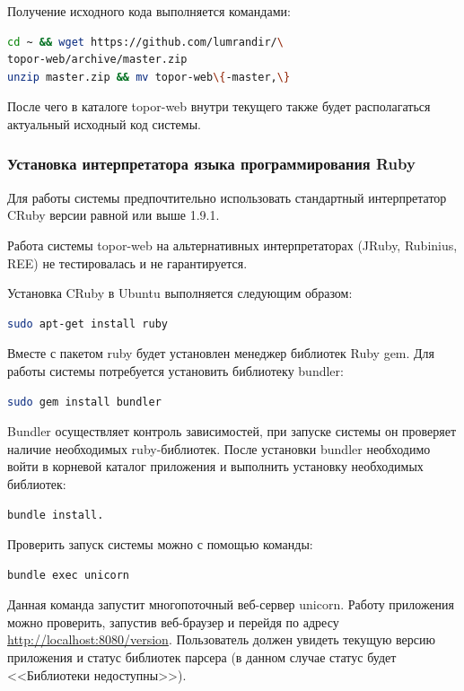 Получение исходного кода выполняется командами:

\begin{lstlisting}[language=bash]
cd ~ && wget https://github.com/lumrandir/\
topor-web/archive/master.zip
unzip master.zip && mv topor-web\{-master,\}
\end{lstlisting}

После чего в каталоге topor-web внутри текущего также будет
располагаться актуальный исходный код системы.

\subsubsection{Установка интерпретатора языка программирования Ruby}

Для работы системы предпочтительно использовать стандартный
интерпретатор CRuby версии равной или выше 1.9.1.

Работа системы topor-web на альтернативных интерпретаторах (JRuby,
Rubinius, REE) не тестировалась и не гарантируется.

Установка CRuby в Ubuntu выполняется следующим образом:

\begin{lstlisting}[language=bash]
sudo apt-get install ruby
\end{lstlisting}

Вместе с пакетом ruby будет установлен менеджер библиотек Ruby gem.
Для работы системы потребуется установить библиотеку bundler:

\begin{lstlisting}[language=bash]
sudo gem install bundler
\end{lstlisting}

Bundler осуществляет контроль зависимостей, при запуске системы он
проверяет наличие необходимых ruby-библиотек. После установки bundler необходимо войти в корневой каталог
приложения и выполнить установку необходимых библиотек: 

\begin{lstlisting}[language=bash]
bundle install.
\end{lstlisting}

Проверить запуск системы можно с помощью команды: 

\begin{lstlisting}[language=bash]
bundle exec unicorn
\end{lstlisting}

Данная команда запустит многопоточный веб-сервер unicorn. Работу
приложения можно проверить, запустив веб-браузер и перейдя по адресу
\url{http://localhost:8080/version}. Пользователь должен увидеть текущую версию
приложения и статус библиотек парсера (в данном случае статус будет
<<Библиотеки недоступны>>).


